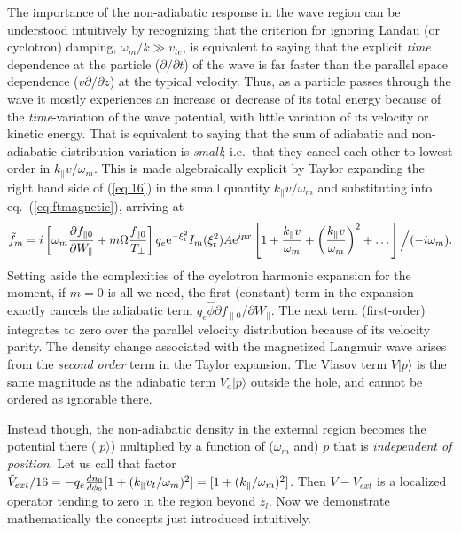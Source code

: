 \documentclass[12pt]{article}
\def\ket#1{|#1\rangle}
\begin{document}
The importance of the non-adiabatic response in the wave region can be
understood intuitively by recognizing that the criterion for ignoring
Landau (or cyclotron) damping, $\omega_m/k\gg v_{te}$, is equivalent
to saying that the explicit \emph{time} dependence at the particle
($\partial/\partial t$) of the wave is far faster than the parallel
space dependence ($v\partial/\partial z$) at the typical
velocity. Thus, as a particle passes through the wave it mostly
experiences an increase or decrease of its total energy because of the
\emph{time}-variation of the wave potential, with little variation of
its velocity or kinetic energy. That is equivalent to saying that the
sum of adiabatic and non-adiabatic distribution variation is
\emph{small}; i.e.\ that they cancel each other to lowest order in
$k_\parallel v/\omega_m$. This is made algebraically explicit by
Taylor expanding the right hand side of (\ref{eq:16}) in the small
quantity $k_\parallel v/\omega_m$ and substituting into eq.\
(\ref{eq:ftmagnetic}), arriving at
\begin{equation}
  \label{eq:17}
  \tilde f_m = i\left[\omega_m
    {\partial f_{\parallel0}\over \partial W_\parallel}
    +m\Omega {f_{\parallel0}\over T_\perp}\right]
  q_e{\rm e}^{-\xi_t^2}I_m(\xi_t^2) A{\rm e}^{ipx}
  \left[1+{k_\parallel v\over\omega_m}+
    \left({k_\parallel v\over\omega_m}\right)^2+\dots\right]
  \Big/(-i\omega_m).
\end{equation}
Setting aside the complexities of the cyclotron harmonic expansion
for the moment, if $m=0$ is all we need, the first (constant) term in
the expansion exactly cancels the adiabatic term
$q_e\hat\phi{\partial f_{\parallel0}/\partial W_\parallel}$. The next
term (first-order) integrates to zero over the parallel velocity
distribution because of its velocity parity. The density change
associated with the magnetized Langmuir wave arises from the
\emph{second order} term in the Taylor expansion. The Vlasov term
$\tilde{V}\ket{p}$ is the same magnitude as the adiabatic term $V_a\ket{p}$
outside the hole, and cannot be ordered as ignorable there.

Instead though, the non-adiabatic density in the external region
becomes the potential there ($\ket{p}$) multiplied by a function of
($\omega_m$ and) $p$ that is \emph{independent of position}. Let us call
that factor $\tilde{V}_{ext}/16=-q_e{dn_0\over d\phi_0}[1+(k_\parallel v_t/\omega_m)^2]=[1+(k_\parallel/\omega_m)^2]$. Then
$\tilde{V}-\tilde{V}_{ext}$ is a localized operator tending to zero in
the region beyond $z_l$. Now we demonstrate mathematically the concepts
just introduced intuitively.
\end{document}
